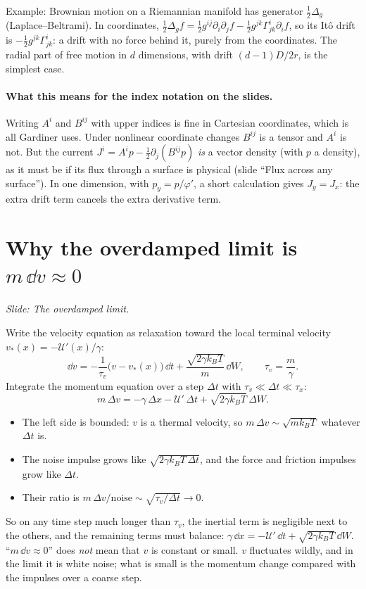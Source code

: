 \documentclass[11pt]{article}
\newcommand{\cU}{\mathcal{U}}
\begin{document}
Example: Brownian motion on a Riemannian manifold has generator $\frac12\Delta_g$ (Laplace--Beltrami). In coordinates,
$\frac12\Delta_gf=\frac12g^{ij}\partial_i\partial_jf-\frac12g^{jk}\Gamma^i_{jk}\partial_if$, so its It\^o drift is
$-\frac12g^{jk}\Gamma^i_{jk}$: a drift with no force behind it, purely from the coordinates. The radial part of
free motion in $d$ dimensions, with drift $(d-1)D/2r$, is the simplest case.

\paragraph{What this means for the index notation on the slides.} Writing $A^i$ and $B^{ij}$ with upper indices is fine
in Cartesian coordinates, which is all Gardiner uses. Under nonlinear coordinate changes $B^{ij}$ is a tensor and $A^i$
is not. But the current $J^i=A^ip-\frac12\partial_j(B^{ij}p)$ \emph{is} a vector density (with $p$ a density), as it
must be if its flux through a surface is physical (slide ``Flux across any surface''). In one dimension, with
$p_y=p/\varphi'$, a short calculation gives $J_y=J_x$: the extra drift term cancels the extra derivative term.

\section{Why the overdamped limit is \texorpdfstring{$m\,\dd v\approx0$}{m dv = 0}}
\emph{Slide: The overdamped limit.}

Write the velocity equation as relaxation toward the local terminal velocity $v_*(x)=-\cU'(x)/\gamma$:
\[
  \dd v = -\frac{1}{\tau_v}\bigl(v-v_*(x)\bigr)\,\dd t + \frac{\sqrt{2\gamma k_BT}}{m}\,\dd W,\qquad \tau_v=\frac m\gamma .
\]
Integrate the momentum equation over a step $\Delta t$ with $\tau_v\ll\Delta t\ll\tau_x$:
\[
  m\,\Delta v = -\gamma\,\Delta x - \cU'\,\Delta t + \sqrt{2\gamma k_BT}\,\Delta W .
\]
\begin{itemize}
  \item The left side is bounded: $v$ is a thermal velocity, so $m\,\Delta v\sim\sqrt{mk_BT}$ whatever $\Delta t$ is.
  \item The noise impulse grows like $\sqrt{2\gamma k_BT\,\Delta t}$, and the force and friction impulses grow like
        $\Delta t$.
  \item Their ratio is $m\,\Delta v/\text{noise}\sim\sqrt{\tau_v/\Delta t}\to0$.
\end{itemize}
So on any time step much longer than $\tau_v$, the inertial term is negligible next to the others, and the
remaining terms must balance: $\gamma\,\dd x=-\cU'\,\dd t+\sqrt{2\gamma k_BT}\,\dd W$. ``$m\,\dd v\approx0$'' does
\emph{not} mean that $v$ is constant or small. $v$ fluctuates wildly, and in the limit it is white noise; what is small
is the momentum change compared with the impulses over a coarse step.
\end{document}
